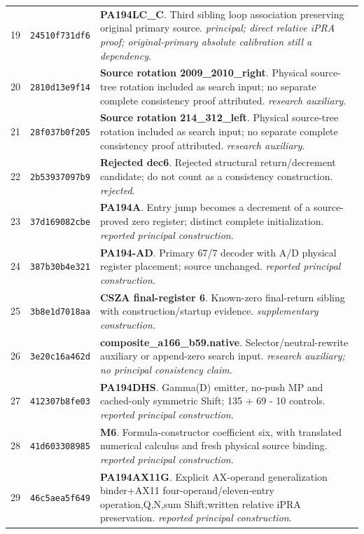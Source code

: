 \begin{longtable}{@{}r p{} p{}@{}}
19 & \texttt{24510f731df6} & \textbf{PA194LC\_C}. Third sibling loop association preserving original primary source. \emph{principal; direct relative iPRA proof; original-primary absolute calibration still a dependency}.\\[3pt]
20 & \texttt{2810d13e9f14} & \textbf{Source rotation 2009\_2010\_right}. Physical source-tree rotation included as search input; no separate complete consistency proof attributed. \emph{research auxiliary}.\\[3pt]
21 & \texttt{28f037b0f205} & \textbf{Source rotation 214\_312\_left}. Physical source-tree rotation included as search input; no separate complete consistency proof attributed. \emph{research auxiliary}.\\[3pt]
22 & \texttt{2b53937097b9} & \textbf{Rejected dec6}. Rejected structural return/decrement candidate; do not count as a consistency construction. \emph{rejected}.\\[3pt]
23 & \texttt{37d169082cbe} & \textbf{PA194A}. Entry jump becomes a decrement of a source-proved zero register; distinct complete initialization. \emph{reported principal construction}.\\[3pt]
24 & \texttt{387b30b4e321} & \textbf{PA194-AD}. Primary 67/7 decoder with A/D physical register placement; source unchanged. \emph{reported principal construction}.\\[3pt]
25 & \texttt{3b8e1d7018aa} & \textbf{CSZA final-register 6}. Known-zero final-return sibling with construction/startup evidence. \emph{supplementary construction}.\\[3pt]
26 & \texttt{3e20c16a462d} & \textbf{composite\_a166\_b59.native}. Selector/neutral-rewrite auxiliary or append-zero search input. \emph{research auxiliary; no principal consistency claim}.\\[3pt]
27 & \texttt{412307b8fe03} & \textbf{PA194DHS}. Gamma(D) emitter, no-push MP and cached-only symmetric Shift; 135 + 69 - 10 controls. \emph{reported principal construction}.\\[3pt]
28 & \texttt{41d603308985} & \textbf{M6}. Formula-constructor coefficient six, with translated numerical calculus and fresh physical source binding. \emph{reported principal construction}.\\[3pt]
29 & \texttt{46c5aea5f649} & \textbf{PA194AX11G}. Explicit AX-operand generalization binder+AX11 four-operand/eleven-entry operation,Q,N,sum Shift;written relative iPRA preservation. \emph{reported principal construction}.\\[3pt]

\end{longtable}
